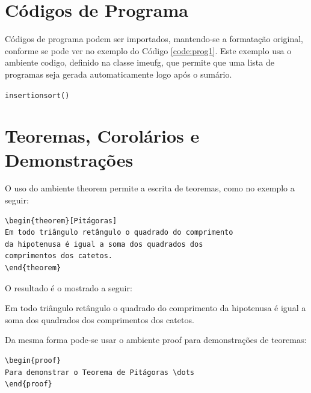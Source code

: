 \section{Códigos de Programa}\label{sec:progs} 

Códigos de programa podem ser importados, mantendo-se a formatação original,
conforme se pode ver no exemplo do Código \ref{code:prog1}. Este exemplo usa o
ambiente \textsf{codigo}, definido na classe \textsf{imeufg}, que permite que
uma lista de programas seja gerada automaticamente logo após o sumário.

\begin{center}
 \begin{minipage}{0.7\textwidth}
  \begin{codigo}[H]
   \small
   \caption{\texttt{insertionsort()}}
   \label{code:prog1}
  \end{codigo}
 \end{minipage}
\end{center}

\section{Teoremas, Corolários e Demonstrações}\label{sec:teor}

O uso do ambiente \textsf{theorem} permite a escrita de teoremas, como no
exemplo a seguir:

\begin{verbatim}
\begin{theorem}[Pitágoras]
Em todo triângulo retângulo o quadrado do comprimento
da hipotenusa é igual a soma dos quadrados dos
comprimentos dos catetos.
\end{theorem}
\end{verbatim}

O resultado é o mostrado a seguir:

\begin{theorem}[Pitágoras]
Em todo triângulo retângulo o quadrado do comprimento da hipotenusa é igual a
  soma dos quadrados dos comprimentos dos catetos.
\end{theorem}

Da mesma forma pode-se usar o ambiente \textsf{proof} para demonstrações de teoremas:
\begin{verbatim}
\begin{proof}
Para demonstrar o Teorema de Pitágoras \dots
\end{proof}
\end{verbatim}

